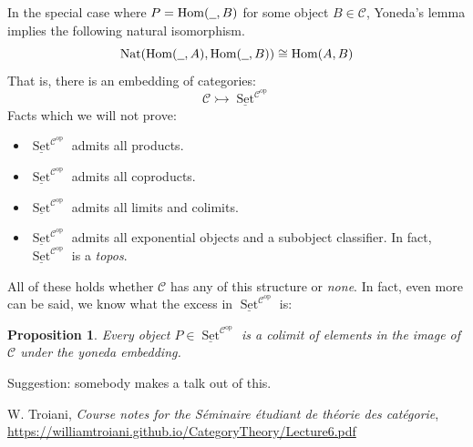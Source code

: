 \documentclass[12pt]{article}
\theoremstyle{plain}
\newtheorem{proposition}[thm]{Proposition}
\theoremstyle{definition}
\newcommand{\scr}[1]{\mathscr{#1}}
\newcommand{\und}[1]{\underline{\hspace{#1 cm}}}
\begin{document}
In the special case where $P = \operatorname{Hom}(\und{0.2}, B)$ for some object $B \in \scr{C}$, Yoneda's lemma implies the following natural isomorphism.
\begin{equation}
	\operatorname{Nat}(\operatorname{Hom}(\und{0.2}, A), \operatorname{Hom}(\und{0.2}, B)) \cong \operatorname{Hom}(A, B)
	\end{equation}
That is, there is an embedding of categories:
\begin{equation}
	\scr{C} \rightarrowtail \underline{\operatorname{Set}}^{\scr{C}^{\operatorname{op}}}
	\end{equation}
Facts which we will not prove:
\begin{itemize}
	\item $\underline{\operatorname{Set}}^{\scr{C}^{\operatorname{op}}}$ admits all products.
	\item $\underline{\operatorname{Set}}^{\scr{C}^{\operatorname{op}}}$ admits all coproducts.
	\item $\underline{\operatorname{Set}}^{\scr{C}^{\operatorname{op}}}$ admits all limits and colimits.
	\item $\underline{\operatorname{Set}}^{\scr{C}^{\operatorname{op}}}$ admits all exponential objects and a subobject classifier. In fact, $\underline{\operatorname{Set}}^{\scr{C}^{\operatorname{op}}}$ is a \emph{topos}.
	\end{itemize}
All of these holds whether $\scr{C}$ has any of this structure or \emph{none}. In fact, even more can be said, we know what the excess in $\underline{\operatorname{Set}}^{\scr{C}^{\operatorname{op}}}$ is:
\begin{proposition}
	Every object $P \in \underline{\operatorname{Set}}^{\scr{C}^{\operatorname{op}}}$ is a colimit of elements in the image of $\scr{C}$ under the yoneda embedding.
	\end{proposition}
Suggestion: somebody makes a talk out of this.
















\begin{thebibliography}{9}
	 W. Troiani, \emph{Course notes for the Séminaire étudiant de théorie des catégorie}, \url{https://williamtroiani.github.io/CategoryTheory/Lecture6.pdf}
	\end{thebibliography}
\end{document}
